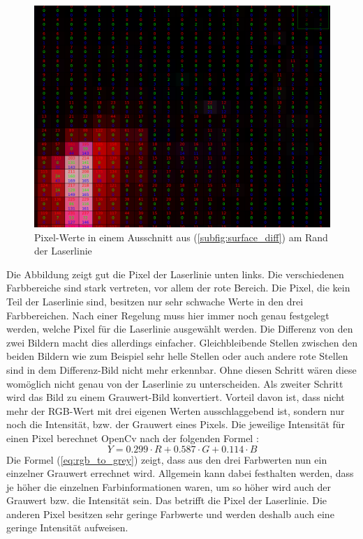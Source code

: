 	\begin{figure}[h]
		\centering
		\includegraphics[width=0.75\linewidth]{img/hauptteil/bildverarbeitung/pixel_values.png}
		\caption[Pixel-Werte der Laserlinie]{Pixel-Werte in einem Ausschnitt aus (\ref{subfig:surface_diff}) am Rand der Laserlinie}
		\label{fig:pix_values}
	\end{figure} 
	
	Die Abbildung zeigt gut die Pixel der Laserlinie unten links. Die verschiedenen Farbbereiche sind stark vertreten, vor allem der rote Bereich. Die Pixel, die kein Teil der Laserlinie sind, besitzen nur sehr schwache Werte in den drei Farbbereichen. Nach einer Regelung muss hier immer noch genau festgelegt werden, welche Pixel für die Laserlinie ausgewählt werden. Die Differenz von den zwei Bildern macht dies allerdings einfacher. Gleichbleibende Stellen zwischen den beiden Bildern wie zum Beispiel sehr helle Stellen oder auch andere rote Stellen sind in dem Differenz-Bild nicht mehr erkennbar. Ohne diesen Schritt wären diese womöglich nicht genau von der Laserlinie zu unterscheiden. \newline
	Als zweiter Schritt wird das Bild zu einem Grauwert-Bild konvertiert. Vorteil davon ist, dass nicht mehr der RGB-Wert mit drei eigenen Werten ausschlaggebend ist, sondern nur noch die Intensität, bzw. der Grauwert eines Pixels. Die jeweilige Intensität für einen Pixel berechnet OpenCv nach der folgenden Formel \cite[Vgl.][]{noauthor_opencv_nodate}:
	\begin{equation}
	Y = 0.299 \cdot R + 0.587 \cdot G + 0.114 \cdot B
	\label{eq:rgb_to_grey}
	\end{equation}
	Die Formel (\ref{eq:rgb_to_grey}) zeigt, dass aus den drei Farbwerten nun ein einzelner Grauwert errechnet wird. Allgemein kann dabei festhalten werden, dass je höher die einzelnen Farbinformationen waren, um so höher wird auch der Grauwert bzw. die Intensität sein. Das betrifft die Pixel der Laserlinie. Die anderen Pixel besitzen sehr geringe Farbwerte und werden deshalb auch eine geringe Intensität aufweisen. 
	
